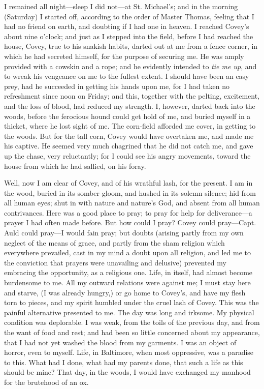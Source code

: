 I remained all night---sleep I did not---at St. Michael's; and in the
morning (Saturday) I started off, according to the order of Master
Thomas, feeling that {\protect\hypertarget{234}{}{}}I had no friend on
earth, and doubting if I had one in heaven. I reached Covey's about nine
o'clock; and just as I stepped into the field, before I had reached the
house, Covey, true to his snakish habits, darted out at me from a fence
corner, in which he had secreted himself, for the purpose of securing
me. He was amply provided with a cowskin and a rope; and he evidently
intended to \emph{tie me up}, and to wreak his vengeance on me to the
fullest extent. I should have been an easy prey, had he succeeded in
getting his hands upon me, for I had taken no refreshment since noon on
Friday; and this, together with the pelting, excitement, and the loss of
blood, had reduced my strength. I, however, darted back into the woods,
before the ferocious hound could get hold of me, and buried myself in a
thicket, where he lost sight of me. The corn-field afforded me cover, in
getting to the woods. But for the tall corn, Covey would have overtaken
me, and made me his captive. He seemed very much chagrined that he did
not catch me, and gave up the chase, very reluctantly; for I could see
his angry movements, toward the house from which he had sallied, on his
foray.

Well, now I am clear of Covey, and of his wrathful lash, for the
present. I am in the wood, buried in its somber gloom, and hushed in its
solemn silence; hid from all human eyes; shut in with nature and
nature's God, and absent from all human contrivances. Here was a good
place to pray; to pray for help for deliverance---a prayer I had often
made before. But how could I pray? Covey could pray---Capt. Auld could
pray---I would fain pray; but doubts (arising
{\protect\hypertarget{235}{}{}}partly from my own neglect of the means
of grace, and partly from the sham religion which everywhere prevailed,
cast in my mind a doubt upon all religion, and led me to the conviction
that prayers were unavailing and delusive) prevented my embracing the
opportunity, as a religious one. Life, in itself, had almost become
burdensome to me. All my outward relations were against me; I must stay
here and starve, (I was already hungry,) or go home to Covey's, and have
my flesh torn to pieces, and my spirit humbled under the cruel lash of
Covey. This was the painful alternative presented to me. The day was
long and irksome. My physical condition was deplorable. I was weak, from
the toils of the previous day, and from the want of food and rest; and
had been so little concerned about my appearance, that I had not yet
washed the blood from my garments. I was an object of horror, even to
myself. Life, in Baltimore, when most oppressive, was a paradise to
this. What had I done, what had my parents done, that such a life as
this should be mine? That day, in the woods, I would have exchanged my
manhood for the brutehood of an ox.

